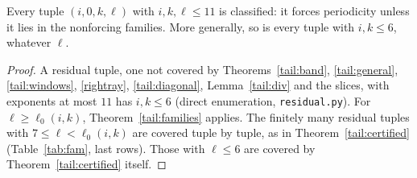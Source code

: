 \begin{corollary}\label{tail:upto11}
Every tuple \((i,0,k,\ell)\) with \(i,k,\ell\le11\) is classified: it forces periodicity unless it lies in the nonforcing families. More generally, so is every tuple with \(i,k\le6\), whatever \(\ell\).
\end{corollary}
\begin{proof}
A residual tuple, one not covered by Theorems~\ref{tail:band}, \ref{tail:general}, \ref{tail:windows}, \ref{rightray}, \ref{tail:diagonal}, Lemma~\ref{tail:div} and the slices, with exponents at most \(11\) has \(i,k\le6\) (direct enumeration, \texttt{residual.py}). For \(\ell\ge\ell_0(i,k)\), Theorem~\ref{tail:families} applies. The finitely many residual tuples with \(7\le\ell<\ell_0(i,k)\) are covered tuple by tuple, as in Theorem~\ref{tail:certified} (Table~\ref{tab:fam}, last rows). Those with \(\ell\le6\) are covered by Theorem~\ref{tail:certified} itself.
\end{proof}
